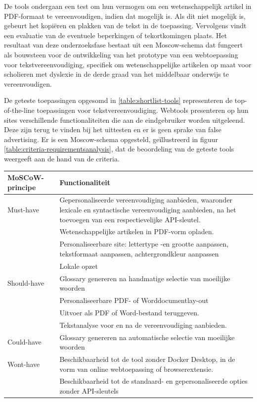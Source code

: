 De tools ondergaan een test om hun vermogen om een wetenschappelijk artikel in PDF-formaat te vereenvoudigen, indien dat mogelijk is. Als dit niet mogelijk is, gebeurt het kopiëren en plakken van de tekst in de toepassing. Vervolgens vindt een evaluatie van de eventuele beperkingen of tekortkomingen plaats. Het resultaat van deze onderzoeksfase bestaat uit een Moscow-schema dat fungeert als bouwsteen voor de ontwikkeling van het prototype van een webtoepassing voor tekstvereenvoudiging, specifiek om wetenschappelijke artikelen op maat voor scholieren met dyslexie in de derde graad van het middelbaar onderwijs te vereenvoudigen.

\medspace

De geteste toepassingen opgesomd in \ref{table:shortlist-tools} representeren de top-of-the-line toepassingen voor tekstvereenvoudiging. Webtools presenteren op hun sites verschillende functionaliteiten die aan de eindgebruiker worden uitgeleend. Deze zijn terug te vinden bij het uittesten en er is geen sprake van false advertising. Er is een Moscow-schema opgesteld, geïllustreerd in figuur \ref{table:criteria-requirementsanalysis}, dat de beoordeling van de geteste tools weergeeft aan de hand van de criteria.

\begin{center}
	\begin{tabular}{ | m{4cm} | m{12cm} | } 
		\hline
		\textbf{MoSCoW-principe} & Functionaliteit \\
		\hline
		Must-have & Gepersonaliseerde vereenvoudiging aanbieden, waaronder lexicale en syntactische vereenvoudiging aanbieden, na het toevoegen van een respectievelijke API-sleutel. \\
		& Wetenschappelijke artikelen in PDF-vorm opladen. \\
		& Personaliseerbare site: lettertype -en grootte aanpassen, tekstformaat aanpassen, achtergrondkleur aanpassen \\
		& Lokale opzet \\
		\hline
		Should-have & Glossary genereren na handmatige selectie van moeilijke woorden \\
		& Personaliseerbare PDF- of Worddocumentlay-out \\
		& Uitvoer als PDF of Word-bestand teruggeven. \\
		& Tekstanalyse voor en na de vereenvoudiging aanbieden. \\
		\hline
		Could-have & Glossary genereren na automatische selectie van moeilijke woorden \\
		\hline
		Wont-have & Beschikbaarheid tot de tool zonder Docker Desktop, in de vorm van online webtoepassing of browserextensie. \\
		& Beschikbaarheid tot de standaard- en gepersonaliseerde opties zonder API-sleutels \\
		\hline
	\end{tabular}
\end{center}











